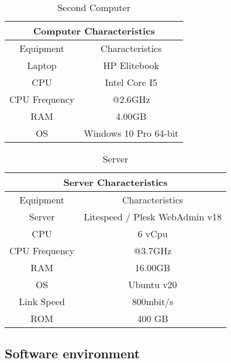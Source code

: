 \documentclass[12pt]{report}
\begin{document}
\begin{table}[!htbp]
    \centering
    \begin{tabular}{|c|c|}
    \hline
    \hline
      \multicolumn{2}{|c|}{Computer Characteristics} \\
        \hline
        \hline
    
        Equipment &  Characteristics \\ \hline
        Laptop &  HP Elitebook \\ \hline
        CPU &  Intel Core I5  \\ \hline
        CPU Frequency &  @2.6GHz \\ \hline
        RAM &  4.00GB \\ \hline
        OS &  Windows 10 Pro 64-bit \\ \hline
        
    \end{tabular}
    \caption{Second Computer}
    \label{tab:pc2}
\end{table}

\begin{table}[!htbp]
    \centering
    \begin{tabular}{|c|c|}
    \hline
    \hline
      \multicolumn{2}{|c|}{Server Characteristics} \\
        \hline
        \hline
    
        Equipment &  Characteristics \\ \hline
        Server &  Litespeed / Plesk WebAdmin v18 \\ \hline
        CPU &  6 vCpu  \\ \hline
        CPU Frequency &  @3.7GHz \\ \hline
        RAM &  16.00GB \\ \hline
        OS &  Ubuntu v20 \\ \hline
        Link Speed &  800mbit/s \\ \hline
        ROM &  400 GB \\ \hline
        
    \end{tabular}
    \caption{Server}
    \label{tab:server}
\end{table}



\pagebreak

\subsection{Software environment}
\end{document}
